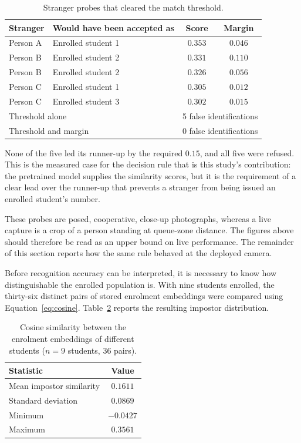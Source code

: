 \documentclass{research}
\begin{document}
\begin{table}[H]
\centering
\caption{Stranger probes that cleared the match threshold.}
\label{tab:margin-caught}
\begin{tabular}{llcc}
\hline
Stranger & Would have been accepted as & Score & Margin \\
\hline
Person A & Enrolled student 1 & $0.353$ & $0.046$ \\
Person B & Enrolled student 2 & $0.331$ & $0.110$ \\
Person B & Enrolled student 2 & $0.326$ & $0.056$ \\
Person C & Enrolled student 1 & $0.305$ & $0.012$ \\
Person C & Enrolled student 3 & $0.302$ & $0.015$ \\
\hline
\multicolumn{2}{l}{Threshold alone} & \multicolumn{2}{r}{5 false identifications} \\
\multicolumn{2}{l}{Threshold and margin} & \multicolumn{2}{r}{0 false identifications} \\
\hline
\end{tabular}
\end{table}

\noindent None of the five led its runner-up by the required $0.15$,
and all five were refused. This is the measured case for the decision
rule that is this study's contribution: the pretrained model supplies
the similarity scores, but it is the requirement of a clear lead over
the runner-up that prevents a stranger from being issued an enrolled
student's number.

These probes are posed, cooperative, close-up photographs, whereas a
live capture is a crop of a person standing at queue-zone distance. The
figures above should therefore be read as an upper bound on live
performance. The remainder of this section reports how the same rule
behaved at the deployed camera.

\label{subsec:enrol-separation}

Before recognition accuracy can be interpreted, it is necessary to know
how distinguishable the enrolled population is. With nine students
enrolled, the thirty-six distinct pairs of stored enrolment embeddings
were compared using Equation~\ref{eq:cosine}. Table~\ref{tab:enrol-sep}
reports the resulting impostor distribution.

\begin{table}[H]
\centering
\caption{Cosine similarity between the enrolment embeddings of different
students ($n = 9$ students, 36 pairs).}
\label{tab:enrol-sep}
\begin{tabular}{lc}
\hline
Statistic & Value \\
\hline
Mean impostor similarity & $0.1611$ \\
Standard deviation       & $0.0869$ \\
Minimum                  & $-0.0427$ \\
Maximum                  & $0.3561$ \\
\hline
\end{tabular}
\end{table}
\end{document}
